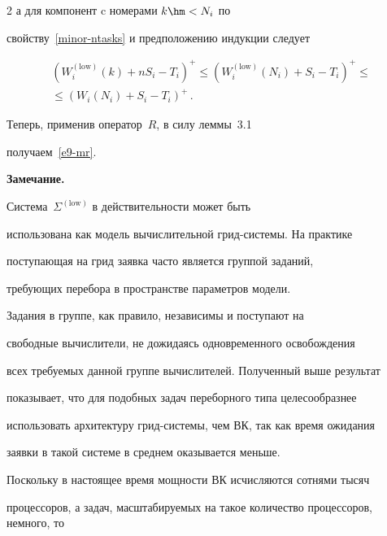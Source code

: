 \begin{multicols}{2}
а для   компонент c номерами  $k\hm<N_i$ по

свойству~\eqref{minor-ntasks} и предположению индукции следует

\begin{multline*}

(W_{i}^{(\mathrm{low})}(k)+nS_{i}-T_{i})^{+} \leqslant

(W_{i}^{(\mathrm{low})}(N_{i})+S_{i}-T_{i})^{+}\leqslant{}\\

{}\leqslant

(W_{i}(N_{i})+S_{i}-T_{i})^{+}\,.

\end{multline*}

Теперь,  применив оператор~$R$,  в силу леммы~3.1

получаем~\eqref{e9-mr}.





\medskip



\noindent

\textbf{Замечание.}

Сис\-те\-ма~$\Sigma^{(\mathrm{low})}$ в действительности  может быть

использована как модель  вычислительной грид-сис\-те\-мы. На практике

поступающая  на грид заявка  часто является группой заданий,

требующих  перебора в пространстве параметров модели.

Задания в группе, как правило, независимы и поступают    на

свободные  вычислители, не дожидаясь одновременного освобождения

всех требуемых данной группе вычислителей. Полученный выше результат

показывает, что для подобных задач переборного типа целесообразнее

использовать архитектуру грид-сис\-те\-мы, чем ВК, так как время ожидания

заявки в такой системе в среднем оказывается меньше.



\smallskip



Поскольку в настоящее время  мощности ВК  исчисляются сотнями тысяч

процессоров, а  задач, масштабируемых на такое количество процессоров, немного, то


\end{multicols}
